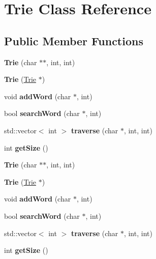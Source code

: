 \hypertarget{class_trie}{}\section{Trie Class Reference}
\label{class_trie}
\subsection*{Public Member Functions}
\begin{DoxyCompactItemize}
\item 
\mbox{\label{class_trie_a5168ff08df4d3dd0255c24167bfdc563}} 
{\bfseries Trie} (char $\ast$$\ast$, int, int)
\item 
\mbox{\label{class_trie_a7d757164056d7e42833fa06807b4b957}} 
{\bfseries Trie} (\hyperlink{class_trie}{Trie} $\ast$)
\item 
\mbox{\label{class_trie_ad793716c7d7e99240d6b3fa5fd1a4ff8}} 
void {\bfseries add\+Word} (char $\ast$, int)
\item 
\mbox{\label{class_trie_a3760a51720b288a6628360008977de6f}} 
bool {\bfseries search\+Word} (char $\ast$, int)
\item 
\mbox{\label{class_trie_ab69ae6a49b6346bf0cdc2589e388a179}} 
std\+::vector$<$ int $>$ {\bfseries traverse} (char $\ast$, int, int)
\item 
\mbox{\label{class_trie_aaf9bd72bfad7fa2ecfe47b7a69c05c51}} 
int {\bfseries get\+Size} ()
\item 
\mbox{\label{class_trie_a5168ff08df4d3dd0255c24167bfdc563}} 
{\bfseries Trie} (char $\ast$$\ast$, int, int)
\item 
\mbox{\label{class_trie_a7d757164056d7e42833fa06807b4b957}} 
{\bfseries Trie} (\hyperlink{class_trie}{Trie} $\ast$)
\item 
\mbox{\label{class_trie_ad793716c7d7e99240d6b3fa5fd1a4ff8}} 
void {\bfseries add\+Word} (char $\ast$, int)
\item 
\mbox{\label{class_trie_a3760a51720b288a6628360008977de6f}} 
bool {\bfseries search\+Word} (char $\ast$, int)
\item 
\mbox{\label{class_trie_a7762c170d018ac4fab93a1bacf9f29aa}} 
std\+::vector$<$ int $>$ {\bfseries traverse} (char $\ast$, int, int)
\item 
\mbox{\label{class_trie_aaf9bd72bfad7fa2ecfe47b7a69c05c51}} 
int {\bfseries get\+Size} ()
\end{DoxyCompactItemize}


